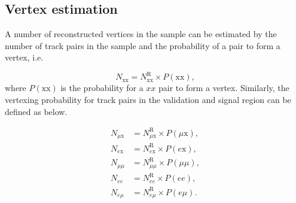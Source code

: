 \subsection{Vertex estimation}
A number of reconstructed vertices in the sample can be estimated by the number of track pairs in the sample and the probability of a pair to form a vertex, i.e.

\begin{equation}
N_{\mathrm{xx}} = N^{\mathrm{R}}_{\mathrm{xx}} \times P(\mathrm{xx}),
\end{equation}
%
where $P(\mathrm{xx})$ is the probability for a $xx$ pair to form a vertex. Similarly, the vertexing probability for track pairs in the validation and signal region can be defined as below.

\begin{align}
\label{estimation_generic}
N_{\mu \mathrm{x}}& = N^{\mathrm{R}}_{\mu \mathrm{x}} \times P(\mu \mathrm{x}), \nonumber \\
N_{e\mathrm{x}} &= N^{\mathrm{R}}_{e\mathrm{x}} \times P(e\mathrm{x}), \nonumber \\
N_{\mu\mu} &= N^{\mathrm{R}}_{\mu\mu} \times P(\mu\mu), \nonumber \\
N_{ee} &= N^{\mathrm{R}}_{ee} \times P(ee), \nonumber \\
N_{e \mu} &= N^{\mathrm{R}}_{e \mu} \times P(e\mu).
\end{align}




